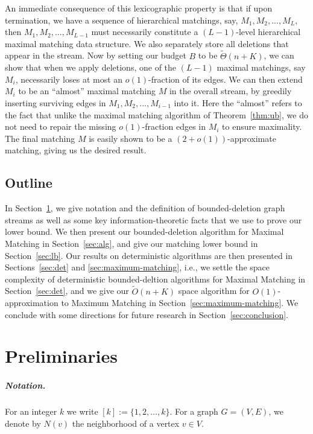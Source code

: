 \documentclass[11pt,a4paper]{article}
\begin{document}
An immediate consequence of this lexicographic property is that if upon termination, we have a sequence of hierarchical matchings, say, $M_1, M_2, ..., M_{L}$, then $M_1, M_2, ..., M_{L-1}$ must necessarily constitute a $(L-1)$-level hierarchical maximal matching data structure. We also separately store all deletions that appear in the stream. Now by setting our budget $B$ to be $\tilde{\Theta}(n+K)$, we can show that when we apply deletions, one of the $(L-1)$ maximal matchings, say $M_i$, necessarily loses at most an $o(1)$-fraction of its edges. We can then extend $M_i$ to be an ``almost'' maximal matching $M$ in the overall stream, by greedily inserting surviving edges in $M_1, M_2, ..., M_{i-1}$ into it. Here the ``almost'' refers to the fact that unlike the maximal matching algorithm of Theorem~\ref{thm:ub}, we do not need to repair the missing $o(1)$-fraction edges in $M_i$ to ensure maximality. The final matching $M$ is easily shown to be a $(2+o(1))$-approximate matching, giving us the desired result.








\subsection{Outline}
In Section~\ref{sec:prelim}, we give notation and the definition of bounded-deletion graph streams as well as some key information-theoretic facts that we use to prove our lower bound. 
We then present our bounded-deletion algorithm for \textsf{Maximal Matching} in Section~\ref{sec:alg}, and give our matching lower bound in Section~\ref{sec:lb}. Our results on deterministic algorithms are then presented in Sections~\ref{sec:det} and \ref{sec:maximum-matching}, i.e., we settle the space complexity of deterministic bounded-deltion algorithms for \textsf{Maximal Matching} in Section~\ref{sec:det}, and we give our $\tilde{O}( n + K)$ space algorithm for $O(1)$-approximation to \textsf{Maximum Matching} in Section~\ref{sec:maximum-matching}. We conclude with some directions for future research in Section~\ref{sec:conclusion}.

\section{Preliminaries}\label{sec:prelim}
\subparagraph{Notation.} For an integer $k$ we write $[k] := \{1, 2, \dots, k \}$. For a graph $G=(V, E)$, we denote by $N(v)$ the neighborhood of a vertex $v \in V$.
\end{document}
